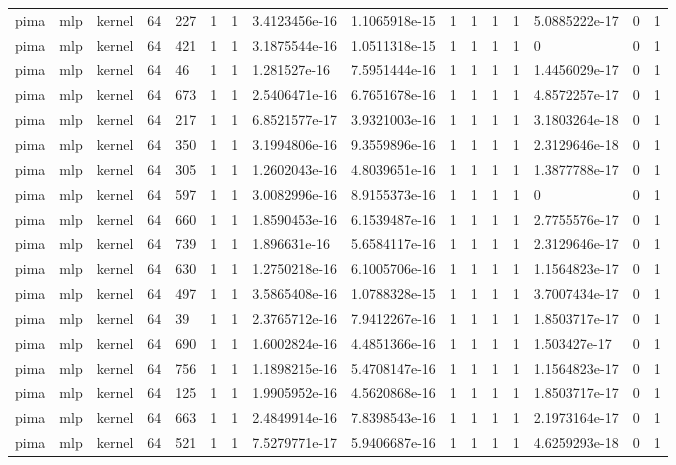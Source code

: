 \begin{tabular}{llllllllllllllll}
pima & mlp & kernel & 64 & 227 & 1 & 1 & 3.4123456e-16 & 1.1065918e-15 & 1 & 1 & 1 & 1 & 5.0885222e-17 & 0 & 1 \\
pima & mlp & kernel & 64 & 421 & 1 & 1 & 3.1875544e-16 & 1.0511318e-15 & 1 & 1 & 1 & 1 & 0 & 0 & 1 \\
pima & mlp & kernel & 64 & 46 & 1 & 1 & 1.281527e-16 & 7.5951444e-16 & 1 & 1 & 1 & 1 & 1.4456029e-17 & 0 & 1 \\
pima & mlp & kernel & 64 & 673 & 1 & 1 & 2.5406471e-16 & 6.7651678e-16 & 1 & 1 & 1 & 1 & 4.8572257e-17 & 0 & 1 \\
pima & mlp & kernel & 64 & 217 & 1 & 1 & 6.8521577e-17 & 3.9321003e-16 & 1 & 1 & 1 & 1 & 3.1803264e-18 & 0 & 1 \\
pima & mlp & kernel & 64 & 350 & 1 & 1 & 3.1994806e-16 & 9.3559896e-16 & 1 & 1 & 1 & 1 & 2.3129646e-18 & 0 & 1 \\
pima & mlp & kernel & 64 & 305 & 1 & 1 & 1.2602043e-16 & 4.8039651e-16 & 1 & 1 & 1 & 1 & 1.3877788e-17 & 0 & 1 \\
pima & mlp & kernel & 64 & 597 & 1 & 1 & 3.0082996e-16 & 8.9155373e-16 & 1 & 1 & 1 & 1 & 0 & 0 & 1 \\
pima & mlp & kernel & 64 & 660 & 1 & 1 & 1.8590453e-16 & 6.1539487e-16 & 1 & 1 & 1 & 1 & 2.7755576e-17 & 0 & 1 \\
pima & mlp & kernel & 64 & 739 & 1 & 1 & 1.896631e-16 & 5.6584117e-16 & 1 & 1 & 1 & 1 & 2.3129646e-17 & 0 & 1 \\
pima & mlp & kernel & 64 & 630 & 1 & 1 & 1.2750218e-16 & 6.1005706e-16 & 1 & 1 & 1 & 1 & 1.1564823e-17 & 0 & 1 \\
pima & mlp & kernel & 64 & 497 & 1 & 1 & 3.5865408e-16 & 1.0788328e-15 & 1 & 1 & 1 & 1 & 3.7007434e-17 & 0 & 1 \\
pima & mlp & kernel & 64 & 39 & 1 & 1 & 2.3765712e-16 & 7.9412267e-16 & 1 & 1 & 1 & 1 & 1.8503717e-17 & 0 & 1 \\
pima & mlp & kernel & 64 & 690 & 1 & 1 & 1.6002824e-16 & 4.4851366e-16 & 1 & 1 & 1 & 1 & 1.503427e-17 & 0 & 1 \\
pima & mlp & kernel & 64 & 756 & 1 & 1 & 1.1898215e-16 & 5.4708147e-16 & 1 & 1 & 1 & 1 & 1.1564823e-17 & 0 & 1 \\
pima & mlp & kernel & 64 & 125 & 1 & 1 & 1.9905952e-16 & 4.5620868e-16 & 1 & 1 & 1 & 1 & 1.8503717e-17 & 0 & 1 \\
pima & mlp & kernel & 64 & 663 & 1 & 1 & 2.4849914e-16 & 7.8398543e-16 & 1 & 1 & 1 & 1 & 2.1973164e-17 & 0 & 1 \\
pima & mlp & kernel & 64 & 521 & 1 & 1 & 7.5279771e-17 & 5.9406687e-16 & 1 & 1 & 1 & 1 & 4.6259293e-18 & 0 & 1 \\

\end{tabular}
